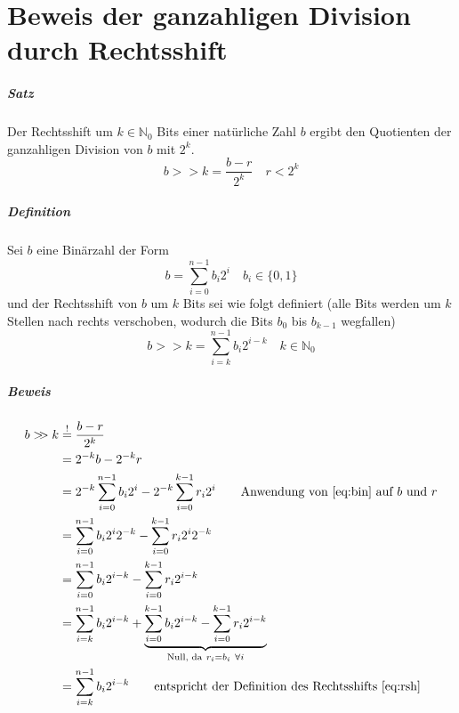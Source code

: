\chapter{Beweis der ganzahligen Division durch Rechtsshift}
\label{annex:proof-division}
\writtenby{\dcauthornameewie}%
\paragraph{Satz}
Der Rechtsshift um $k\in\mathbb{N}_0$ Bits einer natürliche Zahl $b$ ergibt den Quotienten der ganzahligen Division von $b$ mit $2^k$.
\begin{equation}
  b >\!\!> k = \frac{b-r}{2^k} \quad r < 2^k
\end{equation}

\paragraph{Definition}
Sei $b$ eine Binärzahl der Form
\begin{equation}
  \label{eq:bin}
  b = \sum_{i=0}^{n-1} b_i 2^i \quad b_i \in \{0,1\}
\end{equation}
und der Rechtsshift von $b$ um $k$ Bits sei wie folgt definiert (alle Bits werden um $k$ Stellen nach rechts verschoben, wodurch die Bits $b_0$ bis $b_{k-1}$ wegfallen)
\begin{equation}
  \label{eq:rsh}
  b >\!\!> k = \sum_{i=k}^{n-1} b_i 2^{i-k} \quad k \in \mathbb{N}_0
\end{equation}

\paragraph{Beweis}
\begin{align*}
  b >\!\!> k &\overset{!}{=} \frac{b-r}{2^k}  \\
    &= 2^{-k} b - 2^{-k} r \\
    &= 2^{-k} \sum_{i=0}^{n-1} b_i 2^i - 2^{-k} \sum_{i=0}^{k-1} r_i 2^i
      \tag*{Anwendung von \eqref{eq:bin} auf $b$ und $r$} \\
    &= \sum_{i=0}^{n-1} b_i 2^i 2^{-k} - \sum_{i=0}^{k-1} r_i 2^i 2^{-k} \\
    &= \sum_{i=0}^{n-1} b_i 2^{i-k} - \sum_{i=0}^{k-1} r_i 2^{i-k} \\
    &= \sum_{i=k}^{n-1} b_i 2^{i-k} + \underbrace{\sum_{i=0}^{k-1} b_i 2^{i-k} - \sum_{i=0}^{k-1} r_i 2^{i-k}}_{\text{Null, da}~r_i=b_i~\forall i} \\
    &= \sum_{i=k}^{n-1} b_i 2^{i-k}
      \tag*{entspricht der Definition des Rechtsshifts \eqref{eq:rsh}}
\end{align*}
\hfill \qedsymbol
